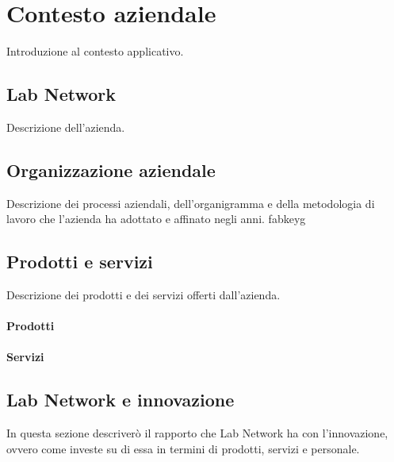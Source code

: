 
\chapter{Contesto aziendale}
\label{cap:introduzione}

Introduzione al contesto applicativo.\\

\section{Lab Network}
Descrizione dell'azienda.

\section{Organizzazione aziendale}
Descrizione dei processi aziendali, dell'organigramma e della metodologia di lavoro che l'azienda ha adottato e affinato negli anni.
\gls{fabkeyg}

\section{Prodotti e servizi}
Descrizione dei prodotti e dei servizi offerti dall'azienda.
\subsubsection{Prodotti}

\subsubsection{Servizi}

\section{Lab Network e innovazione}
In questa sezione descriverò il rapporto che Lab Network ha con l'innovazione, ovvero come investe su di essa in termini di prodotti, servizi e personale.